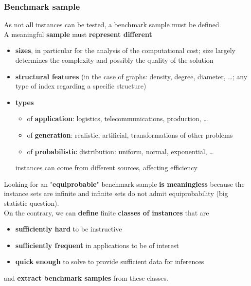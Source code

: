 \newpage

\subsubsection{Benchmark sample}
As not all instances can be tested, a benchmark sample must be defined.\\

A meaningful \textbf{sample} must \textbf{represent different}
\begin{itemize}
	\item \textbf{sizes}, in particular for the analysis of the computational cost; size largely determines the complexity and possibly the quality of the solution
	\item \textbf{structural features} (in the case of graphs: density, degree, diameter, \dots; any type of index regarding a specific structure)
	\item \textbf{types}
	\begin{itemize}
		\item of \textbf{application}: logistics, telecommunications, production, \dots
		\item of \textbf{generation}: realistic, artificial, transformations of other problems
		\item of \textbf{probabilistic} distribution: uniform, normal, exponential, \dots
	\end{itemize}
	instances can come from different sources, affecting efficiency
\end{itemize}

Looking for an "\textbf{equiprobable}" benchmark sample \textbf{is meaningless} because the instance sets are infinite and infinite sets do not admit equiprobability (big statistic question).\\

On the contrary, we can \textbf{define} finite \textbf{classes of instances} that are
\begin{itemize}
	\item \textbf{sufficiently hard} to be instructive
	\item \textbf{sufficiently frequent} in applications to be of interest
	\item \textbf{quick enough} to solve to provide sufficient data for inferences
\end{itemize}
and \textbf{extract benchmark samples} from these classes.

\newpage

